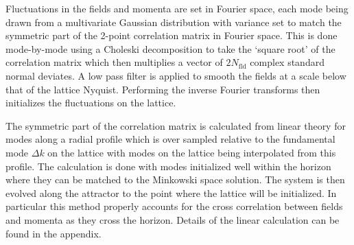 Fluctuations in the fields and momenta are set in Fourier space, each mode being drawn from a multivariate Gaussian distribution with variance set to match the symmetric part of the 2-point correlation matrix in Fourier space. This is done mode-by-mode using a Choleski decomposition to take the `square root' of the correlation matrix which then multiplies a vector of $2N_\mathrm{fld}$ complex standard normal deviates. A low pass filter is applied to smooth the fields at a scale below that of the lattice Nyquist. Performing the inverse Fourier transforms then initializes the fluctuations on the lattice.

The symmetric part of the correlation matrix is calculated from linear theory for modes along a radial profile which is over sampled relative to the fundamental mode $\Delta k$ on the lattice with modes on the lattice being interpolated from this profile. The calculation is done with modes initialized well within the horizon where they can be matched to the Minkowski space solution. The system is then evolved along the attractor to the point where the lattice will be initialized. In particular this method properly accounts for the cross correlation between fields and momenta as they cross the horizon. Details of the linear calculation can be found in the appendix.




